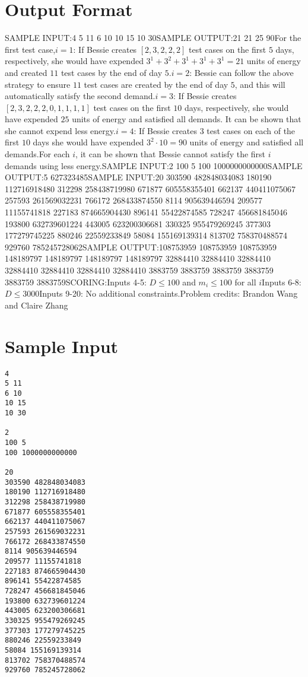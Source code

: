 \documentclass[12pt]{article}
\begin{document}
\section*{Output Format}
SAMPLE INPUT:4
5 11
6 10
10 15
10 30SAMPLE OUTPUT:21
21
25
90For the first test case,$i=1$: If Bessie creates $[2, 3, 2, 2, 2]$ test cases on the first $5$
days, respectively, she would have expended $3^1 + 3^2 + 3^1 + 3^1 + 3^1 = 21$
units of energy and created $11$ test cases by the end of day $5$.$i=2$: Bessie can follow the above strategy to ensure $11$ test cases are
created by the end of day $5$, and this will automatically satisfy the second
demand.$i=3$: If Bessie creates $[2, 3, 2, 2, 2, 0, 1, 1, 1, 1]$ test
cases on the first $10$ days, respectively, she would have expended $25$ units
of energy and satisfied all demands. It can be shown that she cannot expend less
energy.$i=4$: If Bessie creates 3 test cases on each of the first
$10$ days she would have expended $3^{2}\cdot 10 = 90$ units of energy and
satisfied all demands.For each $i$, it can be shown that Bessie cannot satisfy the first $i$ demands using
less energy.SAMPLE INPUT:2
100 5
100 1000000000000SAMPLE OUTPUT:5
627323485SAMPLE INPUT:20
303590 482848034083
180190 112716918480
312298 258438719980
671877 605558355401
662137 440411075067
257593 261569032231
766172 268433874550
8114 905639446594
209577 11155741818
227183 874665904430
896141 55422874585
728247 456681845046
193800 632739601224
443005 623200306681
330325 955479269245
377303 177279745225
880246 22559233849
58084 155169139314
813702 758370488574
929760 785245728062SAMPLE OUTPUT:108753959
108753959
108753959
148189797
148189797
148189797
148189797
32884410
32884410
32884410
32884410
32884410
32884410
32884410
3883759
3883759
3883759
3883759
3883759
3883759SCORING:Inputs 4-5: $D\le 100$ and $m_i \le 100$ for all $i$Inputs 6-8: $D\le 3000$Inputs 9-20: No additional constraints.Problem credits: Brandon Wang and Claire Zhang

\section*{Sample Input}
\begin{verbatim}
4
5 11
6 10
10 15
10 30

2
100 5
100 1000000000000

20
303590 482848034083
180190 112716918480
312298 258438719980
671877 605558355401
662137 440411075067
257593 261569032231
766172 268433874550
8114 905639446594
209577 11155741818
227183 874665904430
896141 55422874585
728247 456681845046
193800 632739601224
443005 623200306681
330325 955479269245
377303 177279745225
880246 22559233849
58084 155169139314
813702 758370488574
929760 785245728062
\end{verbatim}
\end{document}
